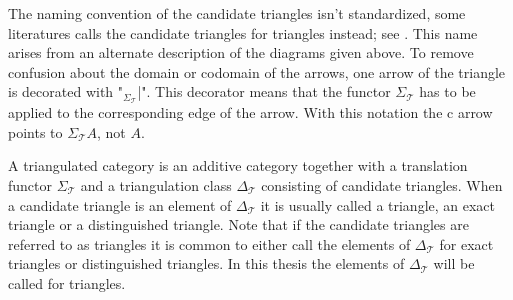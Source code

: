 
    The naming convention of the candidate triangles isn't standardized, some literatures calls the candidate triangles for triangles instead;  see \cite{keller}. This name arises from an alternate description of the diagrams given above. To remove confusion about the domain or codomain of the arrows, one arrow of the triangle is decorated with  "$_{\Sigma_{\mathcal{T}}}$|". This decorator means that the functor $\Sigma_{\mathcal{T}}$ has to be applied to the corresponding edge of the arrow. With this notation the c arrow points to $\Sigma_{\mathcal{T}}A$, not $A$.

    \begin{center}
    \end{center}

     A triangulated category is an additive category together with a translation functor $\Sigma_{\mathcal{T}}$ and a triangulation class $\Delta_{\mathcal{T}}$ consisting of candidate triangles. When a candidate triangle is an element of $\Delta_{\mathcal{T}}$ it is usually called a triangle, an exact triangle or a distinguished triangle. Note that if the candidate triangles are referred to as triangles it is common to either call the elements of $\Delta_{\mathcal{T}}$ for exact triangles or distinguished triangles. In this thesis the elements of $\Delta_{\mathcal{T}}$ will be called for triangles.

